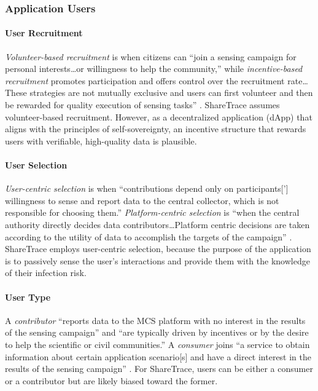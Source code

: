 \subsubsection{Application Users}

\paragraph{User Recruitment}

\emph{Volunteer-based recruitment} is when citizens can ``join a sensing campaign for personal interests{\ldots}or willingness to help the community,'' while \emph{incentive-based recruitment} promotes participation and offers control over the recruitment rate{\ldots}These strategies are not mutually exclusive and users can first volunteer and then be rewarded for quality execution of sensing tasks'' \cite{Capponi2019}. ShareTrace assumes volunteer-based recruitment. However, as a decentralized application (dApp) that aligns with the principles of self-sovereignty, an incentive structure that rewards users with verifiable, high-quality data is plausible.

\paragraph{User Selection}

\emph{User-centric selection} is when ``contributions depend only on participants['] willingness to sense and report data to the central collector, which is not responsible for choosing them.'' \emph{Platform-centric selection} is ``when the central authority directly decides data contributors{\ldots}Platform centric decisions are taken according to the utility of data to accomplish the targets of the campaign'' \cite{Capponi2019}. ShareTrace employs user-centric selection, because the purpose of the application is to passively sense the user's interactions and provide them with the knowledge of their infection risk.

\paragraph{User Type}

A \emph{contributor} ``reports data to the MCS platform with no interest in the results of the sensing campaign'' and ``are typically driven by incentives or by the desire to help the scientific or civil communities.'' A \emph{consumer} joins ``a service to obtain information about certain application scenario[s] and have a direct interest in the results of the sensing campaign'' \cite{Capponi2019}. For ShareTrace, users can be either a consumer or a contributor but are likely biased toward the former.

